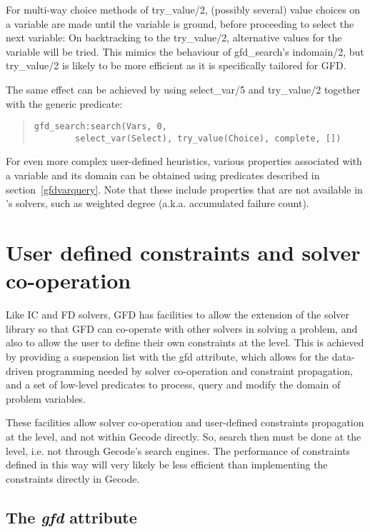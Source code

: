 For multi-way choice methods of try_value/2,  
(possibly several) value choices on a variable are made until the
variable is ground, before proceeding to select the next variable: On
backtracking to the try_value/2, alternative values for the variable
will be tried. This mimics the behaviour of gfd_search's indomain/2,
but try_value/2 is likely to be more efficient as it is specifically
tailored for GFD.

The same effect can be achieved by using select_var/5 and try_value/2
together with the generic
predicate:
\begin{quote}
\begin{verbatim}
gfd_search:search(Vars, 0,
        select_var(Select), try_value(Choice), complete, [])
\end{verbatim}
\end{quote}
For even more complex user-defined heuristics, various properties associated
with a variable and its domain can be obtained using predicates described
in section~\ref{gfdvarquery}. Note that these include properties that are not
available in
\eclipse's solvers, such as weighted degree (a.k.a. accumulated failure count).



\section{User defined constraints and solver co-operation}
Like IC and FD solvers, GFD has facilities to allow the extension of the 
solver library so that GFD can co-operate with other solvers in solving a
problem, and also to allow the user to define their own constraints at the {\eclipse}
level. This is achieved by providing a suspension list with the gfd attribute,
which allows for the data-driven programming needed by solver co-operation and
constraint propagation, and a set of low-level predicates to process,
 query and  modify the domain of problem variables.

These facilities allow solver co-operation and user-defined 
constraints propagation at the {\eclipse} level, and not within Gecode directly.
So, search then must be done at the {\eclipse} level, i.e. not through Gecode's
search engines. The performance of constraints defined in this way will very
likely be less efficient than implementing the constraints directly in Gecode.

\subsection{The {\it gfd\/} attribute}

